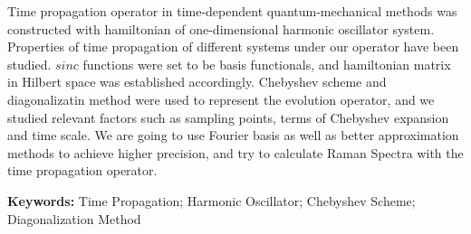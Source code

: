 
Time propagation operator in time-dependent quantum-mechanical methods was constructed with hamiltonian of one-dimensional harmonic oscillator system. Properties of time propagation of different systems under our operator have been studied. $sinc$ functions were set to be basis functionals, and hamiltonian matrix in Hilbert space was established accordingly. Chebyshev scheme and diagonalizatin method were used to represent the evolution operator, and we studied relevant factors such as sampling points, terms of Chebyshev expansion and time scale. We are going to use Fourier basis as well as better approximation methods to achieve higher precision, and try to calculate Raman Spectra with the time propagation operator. 

\bigskip
\noindent \textbf{Keywords: \hspace{\Han}}
Time Propagation; \;
Harmonic Oscillator; \;
Chebyshev Scheme; \;
Diagonalization Method